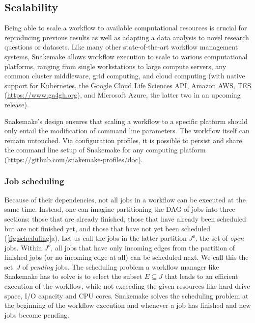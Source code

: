 \documentclass[parskip=half, DIV=18]{scrartcl}
\let\plainurl\url
\renewcommand{\url}[1]{\protect\plainurl{#1}}
\begin{document}
\subsection{Scalability}\label{sec:scalability}

Being able to scale a workflow to available computational resources is crucial for reproducing previous results as well as adapting a data analysis to novel research questions or datasets.
Like many other state-of-the-art workflow management systems, Snakemake allows workflow execution to scale to various computational platforms, ranging from single workstations to large compute servers, any common cluster middleware, grid computing, and cloud computing (with native support for Kubernetes, the Google Cloud Life Sciences API, Amazon AWS, TES (\url{https://www.ga4gh.org}), and Microsoft Azure, the latter two in an upcoming release).

Snakemake's design ensures that scaling a workflow to a specific platform should only entail the modification of command line parameters.
The workflow itself can remain untouched.
Via configuration profiles, it is possible to persist and share the command line setup of Snakemake for any computing platform (\url{https://github.com/snakemake-profiles/doc}).


\subsubsection{Job scheduling}
\label{sec:scheduling}

Because of their dependencies, not all jobs in a workflow can be executed at the same time.
Instead, one can imagine partitioning the DAG of jobs into three sections: 
those that are already finished,
those that have already been scheduled but are not finished yet,
and those that have not yet been scheduled (\autoref{fig:scheduling}a).
Let us call the jobs in the latter partition $J^o$, the set of \emph{open} jobs.
Within $J^o$, all jobs that have only incoming edges from the partition of finished jobs (or no incoming edge at all) can be scheduled next.
We call this the set~$J$ of \emph{pending} jobs.
The scheduling problem a workflow manager like Snakemake has to solve is to select the subset $E \subseteq J$ that leads to an efficient execution of the workflow, while not exceeding the given resources like hard drive space, I/O capacity and CPU cores.
Snakemake solves the scheduling problem at the beginning of the workflow execution and whenever a job has finished and new jobs become pending.
\end{document}
